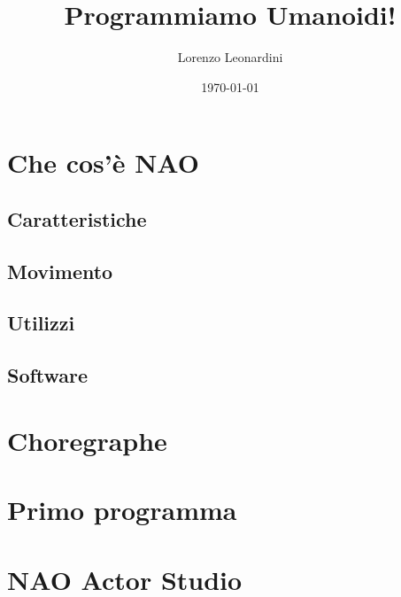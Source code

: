 \documentclass[aspectratio=169]{beamer}
\title{Programmiamo Umanoidi!}
\subtitle{}
\author{Lorenzo Leonardini}
\institute{Scuola di Robotica}
\date{\today}
\begin{document}
\begin{frame}
	\titlepage
\end{frame}

\section{Che cos'è NAO}
\subsection{Caratteristiche}
\subsection{Movimento}
\subsection{Utilizzi}
\subsection{Software}
\section{Choregraphe}
\section{Primo programma}

\fi

\section{NAO Actor Studio}
\end{document}

